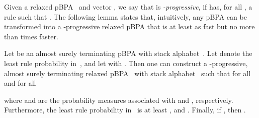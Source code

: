 Given a relaxed pBPA~ and vector ,
 we say that  is {\em -progressive}, if  has, for all ,
 a rule  such that .
The following lemma states that, intuitively, any pBPA can be transformed into a -progressive relaxed pBPA
 that is at least as fast but no more than  times faster.
\begin{lemma} \label{lem:progressive}
 Let  be an almost surely terminating pBPA with stack alphabet~.
 Let  denote the least rule probability in~, and let  with .
 Then one can construct a -progressive, almost surely terminating relaxed pBPA~
  with stack alphabet~ such that for all  and for all 
 
 where  and  are the probability measures associated with  and , respectively.
 Furthermore, the least rule probability in~ is at least , and .
 Finally, if , then .
\end{lemma}
